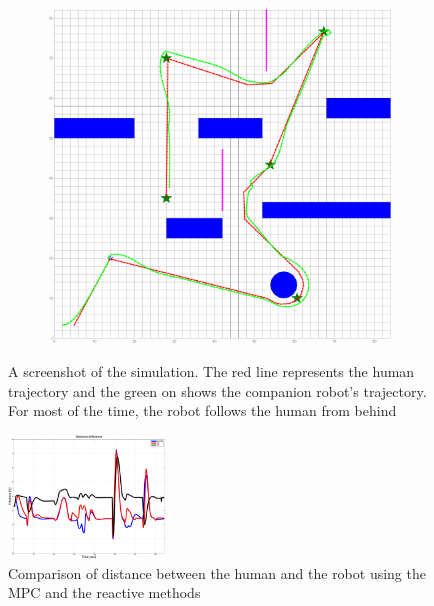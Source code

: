 \documentclass[letterpaper, 10 pt, conference]{ieeeconf}
\begin{document}
\begin{figure}
\begin{subfigure}{0.2\textwidth}
			\caption{}
			\label{fig:ref_traj_end}
		\end{subfigure}
		~
		\begin{subfigure}{0.2\textwidth}
			\includegraphics[width=\textwidth]{figures/sim_traj_end}
			\caption{}
			\label{fig:robot_accom}
		\end{subfigure}
		\caption{A screenshot of the simulation. The red line represents the human trajectory and the green on shows the companion robot's trajectory. For most of the time, the robot follows the human from behind}
	\end{figure}
	
	\begin{figure}
		\centering
		\includegraphics[width=0.37\textwidth]{figures/dis_diff.pdf}
		\caption{Comparison of distance between the human and the robot using the MPC and the reactive methods}
		\label{fig:err_d}
	\end{figure}
	
\end{document}
